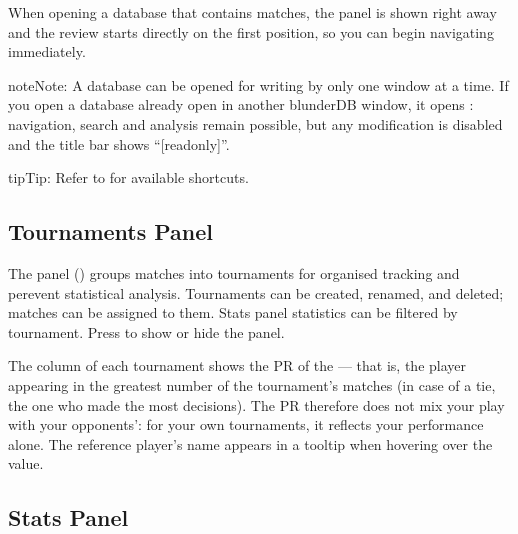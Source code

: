 \documentclass[letterpaper,10pt,english]{sphinxmanual}
\begin{document}
\sphinxAtStartPar
When opening a database that contains matches, the  panel is shown right away and the review starts directly on the first position, so you can begin navigating immediately.

\begin{sphinxadmonition}{note}{Note:}
\sphinxAtStartPar
A database can be opened for writing by only one window at a time. If you open a database already open in another blunderDB window, it opens : navigation, search and analysis remain possible, but any modification is disabled and the title bar shows “{[}read\sphinxhyphen{}only{]}”.
\end{sphinxadmonition}

\begin{sphinxadmonition}{tip}{Tip:}
\sphinxAtStartPar
Refer to {\hyperref[\detokenize{raccourcis:raccourcis}]{}} for available shortcuts.
\end{sphinxadmonition}


\subsection{Tournaments Panel}
\label{\detokenize{manuel:panneau-tournois}}\label{\detokenize{manuel:id8}}
\sphinxAtStartPar
The  panel () groups matches into tournaments for organised tracking and per\sphinxhyphen{}event statistical analysis. Tournaments can be created, renamed, and deleted; matches can be assigned to them. Stats panel statistics can be filtered by tournament. Press  to show or hide the panel.

\sphinxAtStartPar
The  column of each tournament shows the PR of the  — that is, the player appearing in the greatest number of the tournament’s matches (in case of a tie, the one who made the most decisions). The PR therefore does not mix your play with your opponents’: for your own tournaments, it reflects your performance alone. The reference player’s name appears in a tooltip when hovering over the value.


\subsection{Stats Panel}
\label{\detokenize{manuel:panneau-stats}}\label{\detokenize{manuel:stats}}
\end{document}
